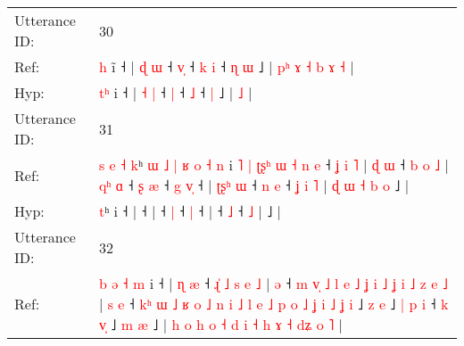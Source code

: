 \documentclass[10pt]{article}
\DeclareRobustCommand{\hl}[1]{{\textcolor{red}{#1}}}
\begin{document}
\begin{longtable}{ll}
 \\
\midrule
Utterance ID: & 30 \\
Ref: & \hl{}\hl{h} i\hl{̃} ˧ | \hl{ɖ} \hl{ɯ} ˧ \hl{v}\hl{̩} ˧\hl{ }\hl{k} \hl{i} ˧\hl{ }\hl{ɳ} \hl{ɯ} ˩ |\hl{ }\hl{p}\hl{ʰ}\hl{ }\hl{ɤ}\hl{ }\hl{˧}\hl{ }\hl{b}\hl{ }\hl{ɤ} \hl{˧} |
 \\
Hyp: & \hl{t}\hl{ʰ} i\hl{} ˧ | \hl{˧} \hl{|} ˧ \hl{}\hl{|} ˧\hl{}\hl{} \hl{˩} ˧\hl{}\hl{} \hl{|} ˩ |\hl{}\hl{}\hl{}\hl{}\hl{}\hl{}\hl{}\hl{}\hl{}\hl{}\hl{} \hl{˩} |
 \\
\midrule
Utterance ID: & 31 \\
Ref: & \hl{s}\hl{ }\hl{e}\hl{ }\hl{˧}\hl{ }\hl{k}ʰ\hl{ }\hl{ɯ}\hl{ }\hl{˩}\hl{ }\hl{|}\hl{ }\hl{ʁ}\hl{ }\hl{o}\hl{ }\hl{˧}\hl{ }\hl{n} i\hl{ }\hl{˥}\hl{ }\hl{|}\hl{ }\hl{ʈ}\hl{ʂ}\hl{ʰ}\hl{ }\hl{ɯ}\hl{ }\hl{˧}\hl{ }\hl{n}\hl{ }\hl{e} ˧\hl{ }\hl{ʝ}\hl{ }\hl{i}\hl{ }\hl{˥} |\hl{ }\hl{ɖ}\hl{ }\hl{ɯ} ˧\hl{ }\hl{b}\hl{ }\hl{o}\hl{ }\hl{˩} |\hl{ }\hl{q}\hl{ʰ}\hl{ }\hl{ɑ} ˧\hl{ }\hl{ʂ} \hl{æ} ˧\hl{ }\hl{g} \hl{v}\hl{̩} ˧ |\hl{ }\hl{ʈ}\hl{ʂ}\hl{ʰ}\hl{ }\hl{ɯ} ˧\hl{ }\hl{n} \hl{e} ˧\hl{ }\hl{ʝ}\hl{ }\hl{i} \hl{˥} |\hl{ }\hl{ɖ}\hl{ }\hl{ɯ}\hl{ }\hl{˧}\hl{ }\hl{b}\hl{ }\hl{o} ˩ |
 \\
Hyp: & \hl{}\hl{}\hl{}\hl{}\hl{}\hl{}\hl{t}ʰ\hl{}\hl{}\hl{}\hl{}\hl{}\hl{}\hl{}\hl{}\hl{}\hl{}\hl{}\hl{}\hl{}\hl{} i\hl{}\hl{}\hl{}\hl{}\hl{}\hl{}\hl{}\hl{}\hl{}\hl{}\hl{}\hl{}\hl{}\hl{}\hl{}\hl{} ˧\hl{}\hl{}\hl{}\hl{}\hl{}\hl{} |\hl{}\hl{}\hl{}\hl{} ˧\hl{}\hl{}\hl{}\hl{}\hl{}\hl{} |\hl{}\hl{}\hl{}\hl{}\hl{} ˧\hl{}\hl{} \hl{|} ˧\hl{}\hl{} \hl{}\hl{|} ˧ |\hl{}\hl{}\hl{}\hl{}\hl{}\hl{} ˧\hl{}\hl{} \hl{˩} ˧\hl{}\hl{}\hl{}\hl{} \hl{˩} |\hl{}\hl{}\hl{}\hl{}\hl{}\hl{}\hl{}\hl{}\hl{}\hl{} ˩ |
 \\
\midrule
Utterance ID: & 32 \\
Ref: & \hl{b}\hl{ }\hl{ə}\hl{ }\hl{˧}\hl{ }\hl{m} i ˧ |\hl{ }\hl{ɳ}\hl{ }\hl{æ} ˧\hl{ }\hl{ɻ}\hl{̍}\hl{ }\hl{˩}\hl{ }\hl{s}\hl{ }\hl{e}\hl{ }\hl{˩} |\hl{ }\hl{ə} ˧\hl{ }\hl{m}\hl{ }\hl{v}\hl{̩}\hl{ }\hl{˩}\hl{ }\hl{l}\hl{ }\hl{e}\hl{ }\hl{˩}\hl{ }\hl{ʝ}\hl{ }\hl{i}\hl{ }\hl{˩}\hl{ }\hl{ʝ}\hl{ }\hl{i}\hl{ }\hl{˩}\hl{ }\hl{z} \hl{e} \hl{˩} | \hl{s} \hl{e} ˧ \hl{k}\hl{ʰ} \hl{ɯ} \hl{˩} \hl{ʁ} \hl{o} \hl{˩} \hl{n} \hl{i} \hl{˩} \hl{l} \hl{e} \hl{˩} \hl{p} \hl{o} \hl{˩} \hl{ʝ} \hl{i} \hl{˩} \hl{ʝ} \hl{i} ˩\hl{ }\hl{z} \hl{e} ˩\hl{ }\hl{|}\hl{ }\hl{p}\hl{ }\hl{i} ˧\hl{ }\hl{k}\hl{ }\hl{v}\hl{̩} ˩\hl{ }\hl{m} \hl{æ} ˩ |\hl{ }\hl{h}\hl{ }\hl{o}\hl{ }\hl{h}\hl{ }\hl{o}\hl{ }\hl{˧}\hl{ }\hl{d}\hl{ }\hl{i}\hl{ }\hl{˧}\hl{ }\hl{h}\hl{ }\hl{ɤ}\hl{ }\hl{˧}\hl{ }\hl{d}\hl{ʑ}\hl{ }\hl{o} \hl{˥} |

\end{longtable}
\end{document}
